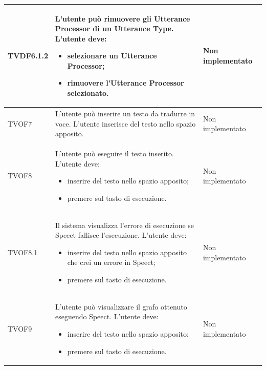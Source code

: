 \documentclass[openany,12pt,a4paper]{report}
\begin{document}
\begin{longtable}{| p{3cm} |p{8cm} | p{2.5cm} |}
	\newline TVDF6.1.2&
	\newline L'utente può rimuovere gli Utterance Processor di un Utterance Type. L'utente deve:
	\begin{itemize}
		\item selezionare un Utterance Processor;
		\item rimuovere l'Utterance Processor selezionato.
	\end{itemize}&
	\newline Non implementato
	\\[1em]
	\hline	
	
	\newline TVOF7&
	\newline L'utente può inserire un testo da tradurre in voce. L'utente inserisce del testo nello spazio apposito.&
	\newline Non implementato
	\\[1em]
	
	\hline
	\newline TVOF8&
	\newline L'utente può eseguire il testo inserito. L'utente deve:
	\begin{itemize}
		\item inserire del testo nello spazio apposito;
		\item premere sul tasto di esecuzione.
	\end{itemize}&
	\newline Non implementato
	\\[1em]
	\hline
	\newline TVOF8.1&
	\newline Il sistema visualizza l'errore di esecuzione se Speect fallisce l'esecuzione. L'utente deve:
	\begin{itemize}
		\item inserire del testo nello spazio apposito che crei un errore in Speect;
		\item premere sul tasto di esecuzione.
	\end{itemize}&
	\newline Non implementato
	\\[1em]
	\hline
	
	\newline TVOF9&
	\newline L'utente può visualizzare il grafo ottenuto eseguendo Speect. L'utente deve:
	\begin{itemize}
		\item inserire del testo nello spazio apposito;
		\item premere sul tasto di esecuzione.
	\end{itemize}&
	\newline Non implementato
	\\[1em]
	\hline
	

\end{longtable}
\end{document}
